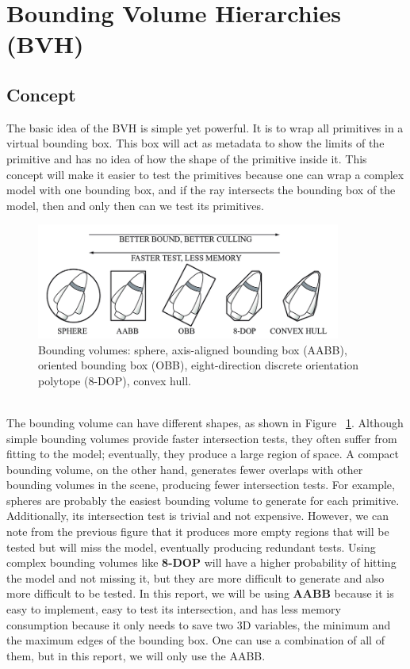 \documentclass[11pt,a4paper]{article}
\begin{document}
\clearpage

\section{Bounding Volume Hierarchies (BVH)}
\subsection{Concept}
The basic idea of the BVH is simple yet powerful. It is to wrap all primitives in a virtual bounding box. This box will act as metadata to show the limits of the primitive and has no idea of how the shape of the primitive inside it. This concept will make it easier to test the primitives because one can wrap a complex model with one bounding box, and if the ray intersects the bounding box of the model, then and only then can we test its primitives.


\begin{figure}[h]	
     \centering
     \captionsetup{justification=centering,margin=2cm}
     \includegraphics[width=10cm]{images/bvs.png}
     \caption{Bounding volumes: sphere, axis-aligned bounding box (AABB), oriented bounding box (OBB), eight-direction discrete orientation polytope (8-DOP), convex hull. \protect\cite{Ericson2004}}
     \label{fig:boundingboxes}
\end{figure}


\noindent
\\
The bounding volume can have different shapes, as shown in Figure ~\ref{fig:boundingboxes}. Although simple bounding volumes provide faster intersection tests, they often suffer from fitting to the model; eventually, they produce a large region of space. A compact bounding volume, on the other hand, generates fewer overlaps with other bounding volumes in the scene, producing fewer intersection tests. For example, spheres are probably the easiest bounding volume to generate for each primitive. Additionally, its intersection test is trivial and not expensive. However, we can note from the previous figure that it produces more empty regions that will be tested but will miss the model, eventually producing redundant tests. Using complex bounding volumes like \textbf{8-DOP} will have a higher probability of hitting the model and not missing it, but they are more difficult to generate and also more difficult to be tested. In this report, we will be using \textbf{AABB} because it is easy to implement, easy to test its intersection, and has less memory consumption because it only needs to save two 3D variables, the minimum and the maximum edges of the bounding box. One can use a combination of all of them, but in this report, we will only use the AABB.
\end{document}
